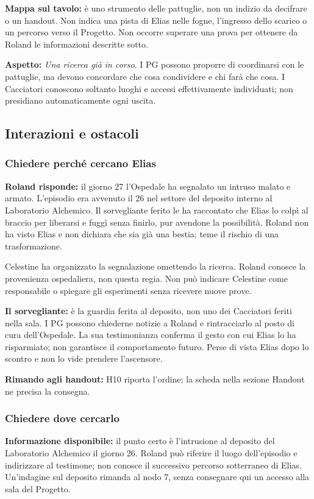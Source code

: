\documentclass[11pt,a4paper]{article}
\newcommand{\aspect}[1]{\textit{\textcolor{blood}{#1}}}
\begin{document}
\textbf{Mappa sul tavolo:} è uno strumento delle pattuglie, non un indizio da decifrare o un handout. Non indica una pista di Elias nelle fogne, l'ingresso dello scarico o un percorso verso il Progetto. Non occorre superare una prova per ottenere da Roland le informazioni descritte sotto.

\textbf{Aspetto:} \aspect{Una ricerca già in corso}. I PG possono proporre di coordinarsi con le pattuglie, ma devono concordare che cosa condividere e chi farà che cosa. I Cacciatori conoscono soltanto luoghi e accessi effettivamente individuati; non presidiano automaticamente ogni uscita.

\subsection{Interazioni e ostacoli}
\subsubsection{Chiedere perché cercano Elias}
\textbf{Roland risponde:} il giorno 27 l'Ospedale ha segnalato un intruso malato e armato. L'episodio era avvenuto il 26 nel settore del deposito interno al Laboratorio Alchemico. Il sorvegliante ferito le ha raccontato che Elias lo colpì al braccio per liberarsi e fuggì senza finirlo, pur avendone la possibilità. Roland non ha visto Elias e non dichiara che sia già una bestia; teme il rischio di una trasformazione.

\begin{gmbox}
Celestine ha organizzato la segnalazione omettendo la ricerca. Roland conosce la provenienza ospedaliera, non questa regia. Non può indicare Celestine come responsabile o spiegare gli esperimenti senza ricevere nuove prove.
\end{gmbox}



\textbf{Il sorvegliante:} è la guardia ferita al deposito, non uno dei Cacciatori feriti nella sala. I PG possono chiederne notizie a Roland e rintracciarlo al posto di cura dell'Ospedale. La sua testimonianza conferma il gesto con cui Elias lo ha risparmiato; non garantisce il comportamento futuro. Perse di vista Elias dopo lo scontro e non lo vide prendere l'ascensore.

\textbf{Rimando agli handout:} H10 riporta l'ordine; la scheda nella sezione Handout ne precisa la consegna.

\subsubsection{Chiedere dove cercarlo}
\textbf{Informazione disponibile:} il punto certo è l'intrusione al deposito del Laboratorio Alchemico il giorno 26. Roland può riferire il luogo dell'episodio e indirizzare al testimone; non conosce il successivo percorso sotterraneo di Elias. Un'indagine sul deposito rimanda al nodo 7, senza consegnare qui un accesso alla sala del Progetto.
\end{document}
